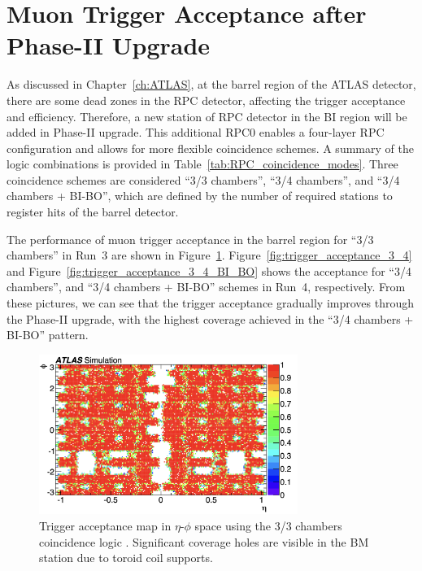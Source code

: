 \section{Muon Trigger Acceptance after Phase-II Upgrade} \label{sec:MuonTriggerAcceptance}
As discussed in Chapter~\ref{ch:ATLAS}, at the barrel region of the ATLAS detector, there are some dead zones in the RPC detector, affecting the trigger acceptance and efficiency. Therefore, a new station of RPC detector in the BI region will be added in Phase-II upgrade. This additional RPC0 enables a four-layer RPC configuration and allows for more flexible coincidence schemes. A summary of the logic combinations is provided in Table~\ref{tab:RPC_coincidence_modes}. Three coincidence schemes are considered ``3/3 chambers'', ``3/4 chambers'', and ``3/4 chambers + BI-BO'', which are defined by the number of required stations to register hits of the barrel detector. 

The performance of muon trigger acceptance in the barrel region for ``3/3 chambers'' in Run~3  are shown in Figure~\ref{fig:trigger_acceptance_3_3}. Figure~\ref{fig:trigger_acceptance_3_4} and Figure~\ref{fig:trigger_acceptance_3_4_BI_BO} shows the acceptance for ``3/4 chambers'', and ``3/4 chambers + BI-BO'' schemes in Run~4, respectively. From these pictures, we can see that the trigger acceptance gradually improves through the Phase-II upgrade, with the highest coverage achieved in the ``3/4 chambers + BI-BO'' pattern.



\begin{figure}[htbp]
  \centering
  \includegraphics[width=0.75\textwidth]{figs/chapter4/trigger_acceptance_map_3_3.png}
  \caption{Trigger acceptance map in $\eta$-$\phi$ space using the 3/3 chambers coincidence logic \cite{TDAQ_TDR}. Significant coverage holes are visible in the BM station due to toroid coil supports.}
  \label{fig:trigger_acceptance_3_3}
\end{figure}


